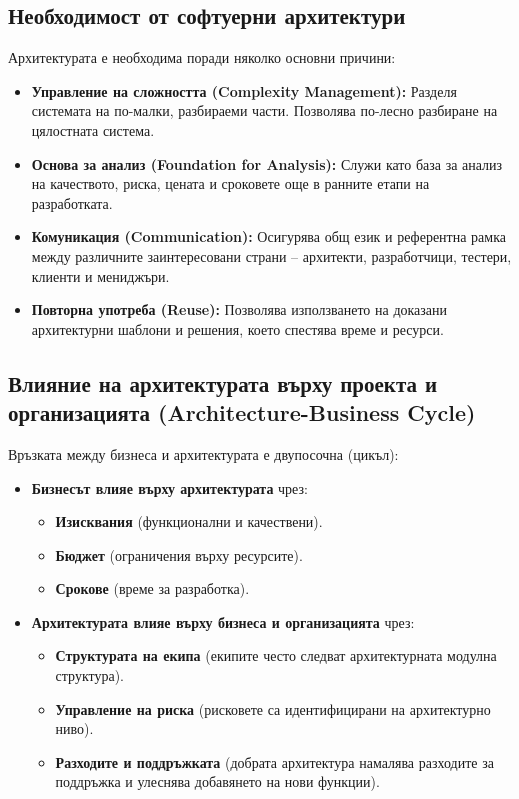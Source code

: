 \documentclass{scrartcl}
\begin{document}
\begin{FlushLeft}
\subsection{Необходимост от софтуерни архитектури}

Архитектурата е необходима поради няколко основни причини:
\begin{itemize}
    \item \textbf{Управление на сложността (Complexity Management):} Разделя системата на по-малки, разбираеми части. Позволява по-лесно разбиране на цялостната система.
    \item \textbf{Основа за анализ (Foundation for Analysis):} Служи като база за анализ на качеството, риска, цената и сроковете още в ранните етапи на разработката.
    \item \textbf{Комуникация (Communication):} Осигурява общ език и референтна рамка между различните заинтересовани страни – архитекти, разработчици, тестери, клиенти и мениджъри.
    \item \textbf{Повторна употреба (Reuse):} Позволява използването на доказани архитектурни шаблони и решения, което спестява време и ресурси.
\end{itemize}

\subsection{Влияние на архитектурата върху проекта и организацията (Architecture-Business Cycle)}

Връзката между бизнеса и архитектурата е двупосочна (цикъл):
\begin{itemize}
    \item \textbf{Бизнесът влияе върху архитектурата} чрез:
    \begin{itemize}
        \item \textbf{Изисквания} (функционални и качествени).
        \item \textbf{Бюджет} (ограничения върху ресурсите).
        \item \textbf{Срокове} (време за разработка).
    \end{itemize}
    \item \textbf{Архитектурата влияе върху бизнеса и организацията} чрез:
    \begin{itemize}
        \item \textbf{Структурата на екипа} (екипите често следват архитектурната модулна структура).
        \item \textbf{Управление на риска} (рисковете са идентифицирани на архитектурно ниво).
        \item \textbf{Разходите и поддръжката} (добрата архитектура намалява разходите за поддръжка и улеснява добавянето на нови функции).
    \end{itemize}
\end{itemize}


\end{FlushLeft}
\end{document}
